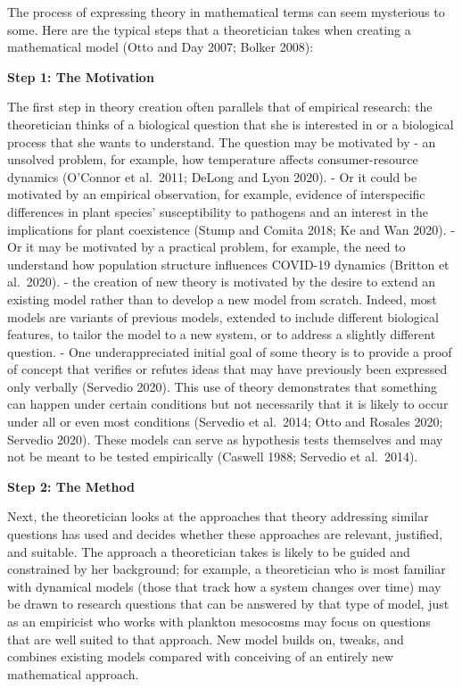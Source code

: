 \documentclass[
]{book}
\theoremstyle{definition}
\theoremstyle{definition}
\theoremstyle{definition}
\theoremstyle{definition}
\theoremstyle{remark}
\begin{document}
The process of expressing theory in mathematical terms can seem mysterious to some. Here are the typical steps that a theoretician takes when creating a mathematical model (Otto and Day 2007; Bolker 2008):

\textbf{Step 1: The Motivation}

The first step in theory creation often parallels that of empirical research: the theoretician thinks of a biological question that she is interested in or a biological process that she wants to understand. The question may be motivated by
- an unsolved problem, for example, how temperature affects consumer-resource dynamics (O'Connor et al.~2011; DeLong and Lyon 2020).
- Or it could be motivated by an empirical observation, for example, evidence of interspecific differences in plant species' susceptibility to pathogens and an interest in the implications for plant coexistence (Stump and Comita 2018; Ke and Wan 2020).
- Or it may be motivated by a practical problem, for example, the need to understand how population structure influences COVID-19 dynamics (Britton et al.~2020).
- the creation of new theory is motivated by the desire to extend an existing model rather than to develop a new model from scratch. Indeed, most models are variants of previous models, extended to include different biological features, to tailor the model to a new system, or to address a slightly different question.
- One underappreciated initial goal of some theory is to provide a proof of concept that verifies or refutes ideas that may have previously been expressed only verbally (Servedio 2020). This use of theory demonstrates that something can happen under certain conditions but not necessarily that it is likely to occur under all or even most conditions (Servedio et al.~2014; Otto and Rosales 2020; Servedio 2020). These models can serve as hypothesis tests themselves and may not be meant to be tested empirically (Caswell 1988; Servedio et al.~2014).

\textbf{Step 2: The Method}

Next, the theoretician looks at the approaches that theory addressing similar questions has used and decides whether these approaches are relevant, justified, and suitable. The approach a theoretician takes is likely to be guided and constrained by her background; for example, a theoretician who is most familiar with dynamical models (those that track how a system changes over time) may be drawn to research questions that can be answered by that type of model, just as an empiricist who works with plankton mesocosms may focus on questions that are well suited to that approach.
New model builds on, tweaks, and combines existing models compared with conceiving of an entirely new mathematical approach.
\end{document}
